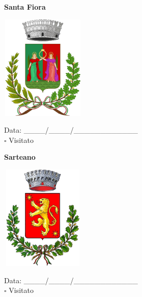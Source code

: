 \documentclass[a5paper,12pt]{article}
\begin{document}
\vspace{0.7cm}

\noindent
\begin{minipage}[t]{0.45\textwidth}
    \begin{center}
        \textbf{Santa Fiora}
    \end{center}
    \vspace{-0.5cm} %
    \begin{center}
        \includegraphics[height= 5cm, width=4cm]{Toscana/Stemma Santa Fiora.png}
    \end{center}
    \vspace{-0.4cm} %
    \begin{flushleft}
        Data: \_\_\_\_/\_\_\_\_/\_\_\_\_\_\_\_\_\_\_\_\_ \\
        $\square$ Visitato
    \end{flushleft}
\end{minipage}
\hfill
\noindent
\begin{minipage}[t]{0.45\textwidth}
    \begin{center}
        \textbf{Sarteano}
    \end{center}
    \vspace{-0.5cm} %
    \begin{center}
        \includegraphics[height= 5cm, width=4cm]{Toscana/Stemma Sarteano.png}
    \end{center}
    \vspace{-0.4cm} %
    \begin{flushleft}
        Data: \_\_\_\_/\_\_\_\_/\_\_\_\_\_\_\_\_\_\_\_\_ \\
        $\square$ Visitato
    \end{flushleft}
\end{minipage}
\end{document}
